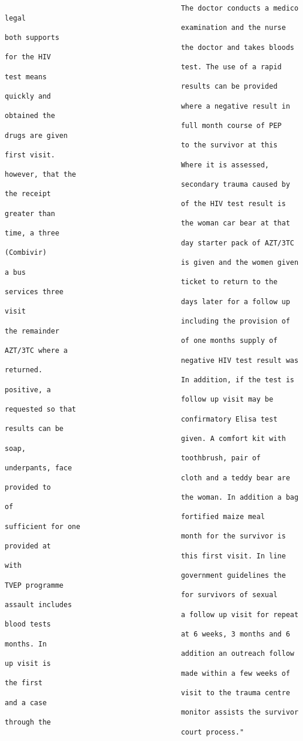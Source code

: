\documentclass{article}
\begin{document}
\begin{verbatim}
                                          The doctor conducts a medico legal
                                          examination and the nurse both supports
                                          the doctor and takes bloods for the HIV
                                          test. The use of a rapid test means
                                          results can be provided quickly and
                                          where a negative result in obtained the
                                          full month course of PEP drugs are given
                                          to the survivor at this first visit.
                                          Where it is assessed, however, that the
                                          secondary trauma caused by the receipt
                                          of the HIV test result is greater than
                                          the woman car bear at that time, a three
                                          day starter pack of AZT/3TC (Combivir)
                                          is given and the women given a bus
                                          ticket to return to the services three
                                          days later for a follow up visit
                                          including the provision of the remainder
                                          of one months supply of AZT/3TC where a
                                          negative HIV test result was returned.
                                          In addition, if the test is positive, a
                                          follow up visit may be requested so that
                                          confirmatory Elisa test results can be
                                          given. A comfort kit with soap,
                                          toothbrush, pair of underpants, face
                                          cloth and a teddy bear are provided to
                                          the woman. In addition a bag of
                                          fortified maize meal sufficient for one
                                          month for the survivor is provided at
                                          this first visit. In line with
                                          government guidelines the TVEP programme
                                          for survivors of sexual assault includes
                                          a follow up visit for repeat blood tests
                                          at 6 weeks, 3 months and 6 months. In
                                          addition an outreach follow up visit is
                                          made within a few weeks of the first
                                          visit to the trauma centre and a case
                                          monitor assists the survivor through the
                                          court process."
          

\end{verbatim}
\end{document}
